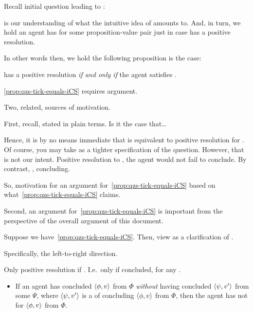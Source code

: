 \begin{note}
  Recall initial question leading to \zs{}:

  \begin{quote}
    \questionZS*
  \end{quote}

  \iCS{} is our understanding of what the intuitive idea of \csN{} amounts to.
  And, in turn, we hold an agent has \csVed{} for some proposition-value pair just in case \qzs{} has a positive resolution.

  In other words then, we hold the following proposition is the case:
  \begin{proposition}
    \label{prop:qzs-tick-equals-iCS}
    \qzs{} has a positive resolution \emph{if and only if} the agent satisfies \iCS{}.
  \end{proposition}

  \autoref{prop:qzs-tick-equals-iCS} requires argument.

  Two, related, sources of motivation.

  First, recall, \qzs{} stated in plain terms.
  Is it the case that\dots

  Hence, it is by no means immediate that \iCS{} is equivalent to positive resolution for \qzs{}.
  Of course, you may take \iCS{} as a tighter specification of the question.
  However, that is not our intent.
  Positive resolution to \qzs{}, the agent would not fail to conclude.
  By contrast, \iCS{}, concluding.

  So, motivation for an argument for~\autoref{prop:qzs-tick-equals-iCS} based on what~\autoref{prop:qzs-tick-equals-iCS} claims.


  Second, an argument for~\autoref{prop:qzs-tick-equals-iCS} is important from the perspective of the overall argument of this document.

  Suppose we have~\autoref{prop:qzs-tick-equals-iCS}.
  Then, view \iCS{} as a clarification of \qzs{}.

  Specifically, the left-to-right direction.

  Only positive resolution if \iCS{}.
  I.e.\ only if concluded, for any \requ{}.

  \begin{itemize}
  \item
    If an agent has concluded \(\langle \phi, v \rangle\) from \(\Phi\) \emph{without} having concluded \(\langle \psi, v' \rangle\) from some \(\Psi\), where \(\langle \psi, v' \rangle\) is a \requ{} of concluding \(\langle \phi, v \rangle\) from \(\Phi\), then the agent has not \csVed{} for \(\langle \phi, v \rangle\) from \(\Phi\).
  \end{itemize}


\end{note}
